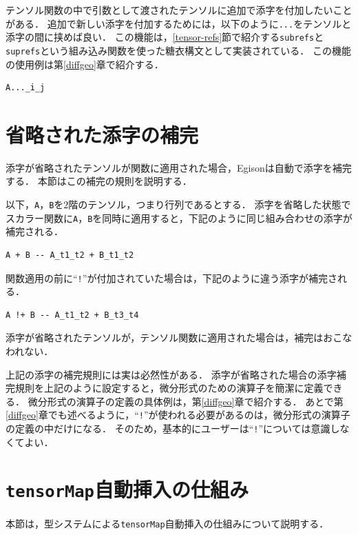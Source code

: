 テンソル関数の中で引数として渡されたテンソルに追加で添字を付加したいことがある．
追加で新しい添字を付加するためには，以下のように\lstinline{...}をテンソルと添字の間に挟めば良い．
この機能は，\ref{tensor-refs}節で紹介する\lstinline{subrefs}と\lstinline{suprefs}という組み込み関数を使った糖衣構文として実装されている．
この機能の使用例は第\ref{diffgeo}章で紹介する．
\begin{lstlisting}[language=egison,numbers=none]
A..._i_j
\end{lstlisting}

\section{省略された添字の補完}\label{tensor-completion}

添字が省略されたテンソルが関数に適用された場合，Egisonは自動で添字を補完する．
本節はこの補完の規則を説明する．

以下，\lstinline{A}，\lstinline{B}を$2$階のテンソル，つまり行列であるとする．
添字を省略した状態でスカラー関数に\lstinline{A}，\lstinline{B}を同時に適用すると，下記のように同じ組み合わせの添字が補完される．
\begin{lstlisting}[language=egison,numbers=none]
A + B -- A_t1_t2 + B_t1_t2
\end{lstlisting}
関数適用の前に``\lstinline|!|''が付加されていた場合は，下記のように違う添字が補完される．
\begin{lstlisting}[language=egison,numbers=none]
A !+ B -- A_t1_t2 + B_t3_t4
\end{lstlisting}

添字が省略されたテンソルが，テンソル関数に適用された場合は，補完はおこなわれない．

上記の添字の補完規則には実は必然性がある．
添字が省略された場合の添字補完規則を上記のように設定すると，微分形式のための演算子を簡潔に定義できる．
微分形式の演算子の定義の具体例は，第\ref{diffgeo}章で紹介する．
あとで第\ref{diffgeo}章でも述べるように，``\verb|!|''が使われる必要があるのは，微分形式の演算子の定義の中だけになる．
そのため，基本的にユーザーは``\verb|!|''については意識しなくてよい．

\section{\texttt{tensorMap}自動挿入の仕組み}\label{tensor-tensormap}

本節は，型システムによる\lstinline{tensorMap}自動挿入の仕組みについて説明する．


